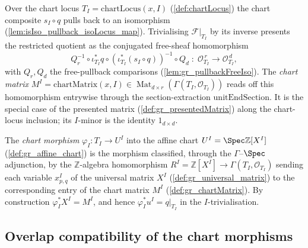 \begin{definition}
  \label{def:gr_chartMatrix}
  Over the chart locus \(T_I = \mathrm{chartLocus}(x, I)\) (\cref{def:chartLocus}) the chart
  composite \(s_I \circ q\) pulls back to an isomorphism
  (\cref{lem:isIso_pullback_isoLocus_map}). Trivialising \(\mathcal{F}|_{T_I}\) by its
  inverse presents the restricted quotient as the conjugated free-sheaf homomorphism
  \[
    Q_r^{-1} \circ \iota_{T_I}^{*}q \circ (\iota_{T_I}^{*}(s_I \circ q))^{-1} \circ Q_d
      \;:\; \mathcal{O}_{T_I}^{\,r} \longrightarrow \mathcal{O}_{T_I}^{\,d},
  \]
  with \(Q_r, Q_d\) the free-pullback comparisons (\cref{lem:gr_pullbackFreeIso}). The
  \emph{chart matrix} \(M^I = \mathrm{chartMatrix}(x, I) \in
  \operatorname{Mat}_{d\times r}(\Gamma(T_I, \mathcal{O}_{T_I}))\) reads off this
  homomorphism entrywise through the section-extraction \(\mathrm{unitEndSection}\). It is
  the special case of the presented matrix (\cref{def:gr_presentedMatrix}) along the
  chart-locus inclusion; its \(I\)-minor is the identity \(1_{d\times d}\).
\end{definition}

\begin{definition}
  \label{def:gr_chartMorphism}
  The \emph{chart morphism} \(\varphi_I : T_I \to U^I\) into the affine chart
  \(U^I = \Spec \mathbb{Z}[X^I]\) (\cref{def:gr_affine_chart}) is the morphism classified,
  through the \(\Gamma\)--\(\Spec\) adjunction, by the \(\mathbb{Z}\)-algebra homomorphism
  \(R^I = \mathbb{Z}[X^I] \to \Gamma(T_I, \mathcal{O}_{T_I})\) sending each variable
  \(x^I_{p,q}\) of the universal matrix \(X^I\) (\cref{def:gr_universal_matrix}) to the
  corresponding entry of the chart matrix \(M^I\) (\cref{def:gr_chartMatrix}). By
  construction \(\varphi_I^{*}X^I = M^I\), and hence \(\varphi_I^{*}u^I = q|_{T_I}\) in the
  \(I\)-trivialisation.
\end{definition}

\subsection{Overlap compatibility of the chart morphisms}

